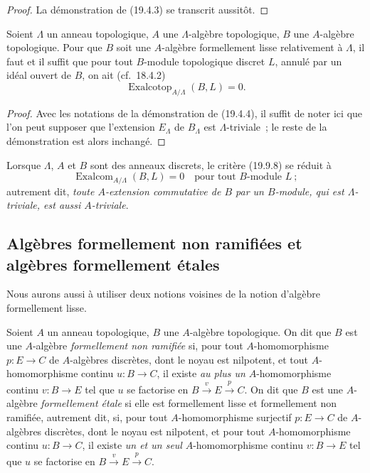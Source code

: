 \begin{proof}
La démonstration de (19.4.3) se transcrit aussitôt.
\end{proof}

\begin{proposition}[19.9.8]
\label{0.19.9.8-fr}
Soient $\Lambda$ un anneau topologique, $A$ une $\Lambda$-algèbre topologique,
$B$ une $A$-algèbre topologique. Pour que $B$ soit une $A$-algèbre
formellement lisse relativement à $\Lambda$, il faut et il suffit que pour tout
$B$-module topologique discret $L$, annulé par un idéal ouvert de $B$, on ait
(cf.~18.4.2)
\[
  \operatorname{Exalcotop}_{A/\Lambda}(B,L)=0.
\]
\end{proposition}

\begin{proof}
Avec les notations de la démonstration de (19.4.4), il suffit de noter ici que
l'on peut supposer que l'extension $E_\Lambda$ de $B_\Lambda$ est
$\Lambda$-triviale~; le reste de la démonstration est alors inchangé.
\end{proof}

Lorsque $\Lambda$, $A$ et $B$ sont des anneaux discrets, le critère (19.9.8) se
réduit à
\begin{equation}
\tag{19.9.8.1}
\label{0.19.9.8.1-fr}
  \operatorname{Exalcom}_{A/\Lambda}(B,L)=0
  \quad\text{pour tout $B$-module $L$}~;
\end{equation}
autrement dit, \emph{toute $A$-extension commutative de $B$ par un $B$-module,
qui est $\Lambda$-triviale, est aussi $A$-triviale}.

\subsection{Algèbres formellement non ramifiées et algèbres formellement
étales}
\label{subsection:0.19.10-fr}
\label{0.19.10-fr}

\begin{env}[19.10.1]
\label{0.19.10.1-fr}
Nous aurons aussi à utiliser deux notions voisines de la notion d'algèbre
formellement lisse.
\end{env}

\begin{definition}[19.10.2]
\label{0.19.10.2-fr}
Soient $A$ un anneau topologique, $B$ une $A$-algèbre topologique. On dit que
$B$ est une $A$-algèbre \emph{formellement non ramifiée} si, pour tout
$A$-homomorphisme $p:E\to C$ de $A$-algèbres discrètes, dont le noyau est
nilpotent, et tout $A$-homomorphisme continu $u:B\to C$, il existe \emph{au plus
un} $A$-homomorphisme continu $v:B\to E$ tel que $u$ se factorise en
$B\xrightarrow{v}E\xrightarrow{p}C$. On dit que $B$ est une $A$-algèbre
\emph{formellement étale} si elle est formellement lisse et formellement non
ramifiée, autrement dit, si, pour tout $A$-homomorphisme surjectif $p:E\to C$
de $A$-algèbres discrètes, dont le noyau est nilpotent, et pour tout
$A$-homomorphisme continu $u:B\to C$, il existe \emph{un et un seul}
$A$-homomorphisme continu $v:B\to E$ tel que $u$ se factorise en
$B\xrightarrow{v}E\xrightarrow{p}C$.
\end{definition}

